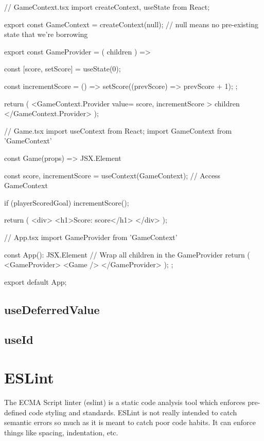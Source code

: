 \documentclass{article}
\begin{document}
\begin{tslst}

// GameContext.tsx
import { createContext, useState } from React;

export const GameContext = createContext(null); // null means no pre-existing state that we're borrowing

export const GameProvider = ({ children }) => {
    const [score, setScore] = useState(0);

    const incrementScore = () => {
        setScore((prevScore) => prevScore + 1);
    };

    return (
        <GameContext.Provider value={{ score, incrementScore }}>
            { children }
        </GameContext.Provider>
    );
}

// Game.tsx
import { useContext } from React;
import { GameContext } from 'GameContext'

const Game(props) => JSX.Element {
    const { score, incrementScore } = useContext(GameContext); // Access GameContext

    if (playerScoredGoal) {
        incrementScore();
    }

    return (
        <div>
            <h1>Score: {score}</h1>
        </div>
    );
}

// App.tsx
import { GameProvider } from 'GameContext'

const App(): JSX.Element {
    // Wrap all children in the GameProvider
    return (
        <GameProvider>
            <Game />
        </GameProvider>
    );
};

export default App;

\end{tslst}

\subsection{useDeferredValue}

\subsection{useId}

\section{ESLint}

The ECMA Script linter (eslint) is a static code analysis tool which enforces pre-defined code styling and
standards. ESLint is not really intended to catch semantic errors so much as it is meant to catch poor code
habits. It can enforce things like spacing, indentation, etc.
\end{document}
